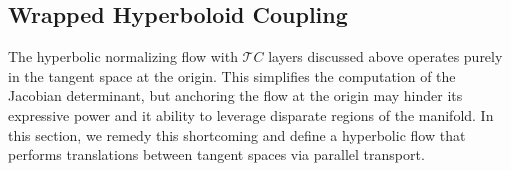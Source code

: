 \subsection{Wrapped Hyperboloid Coupling}
\label{wrapped_hyerboloid_coupling_section}
The hyperbolic normalizing flow with $\mathcal{T}C$ layers discussed above operates purely in the tangent space at the origin.
This simplifies the computation of the Jacobian determinant, but anchoring the flow at the origin may hinder its expressive power and it ability to leverage disparate regions of the manifold. 
In this section, we remedy this shortcoming and define a hyperbolic flow that performs translations between tangent spaces via parallel transport. 

